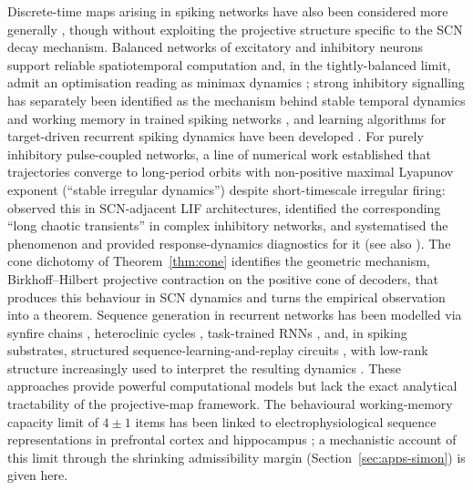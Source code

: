 \documentclass[12pt]{article}
\begin{document}
Discrete-time maps arising in spiking networks have also been considered more generally \citep{cessac2010overview}, though without exploiting the projective structure specific to the SCN decay mechanism. Balanced networks of excitatory and inhibitory neurons \citep{brunel2000dynamics} support reliable spatiotemporal computation \citep{pyle2017spatiotemporal} and, in the tightly-balanced limit, admit an optimisation reading as minimax dynamics \citep{li2020minimax}; strong inhibitory signalling has separately been identified as the mechanism behind stable temporal dynamics and working memory in trained spiking networks \citep{kim2021strong}, and learning algorithms for target-driven recurrent spiking dynamics have been developed \citep{kim2018learning}. For purely inhibitory pulse-coupled networks, a line of numerical work established that trajectories converge to long-period orbits with non-positive maximal Lyapunov exponent (``stable irregular dynamics'') despite short-timescale irregular firing: \citet{jin2002fast,jin2002fastcomputation} observed this in SCN-adjacent LIF architectures, \citet{zumdieck2004long} identified the corresponding ``long chaotic transients'' in complex inhibitory networks, and \citet{jahnke2008stable,jahnke2009chaotic} systematised the phenomenon and provided response-dynamics diagnostics for it (see also \citealp{timme2007revealing}). The cone dichotomy of Theorem~\ref{thm:cone} identifies the geometric mechanism, Birkhoff--Hilbert projective contraction on the positive cone of decoders, that produces this behaviour in SCN dynamics and turns the empirical observation into a theorem. Sequence generation in recurrent networks has been modelled via synfire chains \citep{abeles1991corticonics}, heteroclinic cycles \citep{rabinovich2008transient}, task-trained RNNs \citep{sussillo2009force,sussillo2013blackbox,maheswaranathan2019universality}, and, in spiking substrates, structured sequence-learning-and-replay circuits \citep{bouhadjar2022sequence}, with low-rank structure increasingly used to interpret the resulting dynamics \citep{barak2017recurrent,driscoll2024flexible,vyas2020ctd}. These approaches provide powerful computational models but lack the exact analytical tractability of the projective-map framework. The behavioural working-memory capacity limit of $4\pm 1$ items \citep{cowan2001magical} has been linked to electrophysiological sequence representations in prefrontal cortex \citep{averbeck2002parallel} and hippocampus \citep{baeg2003dynamics}; a mechanistic account of this limit through the shrinking admissibility margin (Section~\ref{sec:apps-simon}) is given here.
\end{document}
